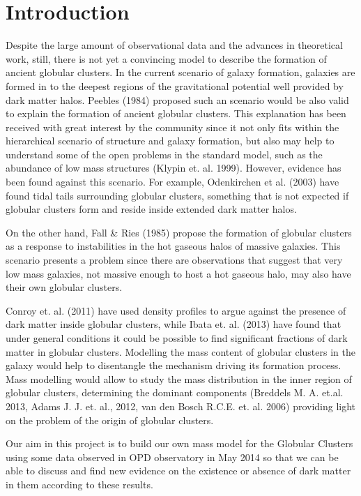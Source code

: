 \chapter{Introduction}

Despite the large amount of observational data and the advances in theoretical work, still, there is not yet a convincing model to describe the formation of ancient globular clusters. In the current scenario of galaxy formation, galaxies are formed in to the deepest regions of the gravitational potential well provided by dark matter halos. Peebles (1984) proposed such an scenario would be also valid to explain the formation of ancient globular clusters. This explanation has been received with great interest by the community since it not only fits within the hierarchical scenario of structure and galaxy formation, but also may help to understand some of the open problems in the standard model, such as the abundance of low mass structures (Klypin et. al. 1999). However, evidence has been found against this scenario. For example, Odenkirchen et al. (2003) have found tidal tails surrounding globular clusters, something that is not expected if globular clusters form and reside inside extended dark matter halos.

On the other hand, Fall \& Ries (1985) propose the formation of globular clusters as a response to instabilities in the hot gaseous halos of massive galaxies. This scenario presents a problem since there are observations that suggest that very low mass galaxies, not massive enough to host a hot gaseous halo, may also have their own globular clusters.

Conroy et. al. (2011) have used density profiles to argue against the presence of dark matter inside globular clusters, while Ibata et. al. (2013) have found that under general conditions it could be possible to find significant fractions of dark matter in globular clusters. Modelling the mass content of globular clusters in the galaxy would help to disentangle the mechanism driving its formation process. Mass modelling would allow to study the mass distribution in the
inner region of globular clusters, determining the dominant components (Breddels M. A. et.al. 2013, Adams J. J. et. al., 2012, van den Bosch R.C.E. et. al. 2006) providing light on the problem of the origin of globular clusters.

Our aim in this project is to build our own mass model for the Globular Clusters using some data observed in OPD observatory in May 2014 so that we can be able to discuss and find new evidence on the existence or absence of dark matter in them according to these results. 

